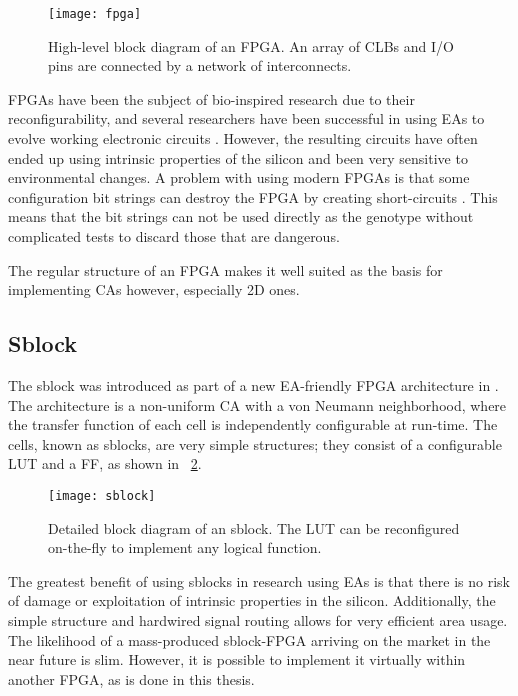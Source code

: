\begin{figure}[!ht]
    \centering
    \texttt{[image: fpga]}
    \caption[FPGA]{
        High-level block diagram of an FPGA.
        An array of CLBs and I/O pins are connected by a network of interconnects.
    }
    \label{fig:fpga}
\end{figure}

FPGAs have been the subject of bio-inspired research due to their reconfigurability, and several researchers have been successful in using EAs to evolve working electronic circuits \cite{huelsbergen1998evolution, thompson1997evolved}.
However, the resulting circuits have often ended up using intrinsic properties of the silicon and been very sensitive to environmental changes.
A problem with using modern FPGAs is that some configuration bit strings can destroy the FPGA by creating short-circuits \cite{xapp151, ug380}.
This means that the bit strings can not be used directly as the genotype without complicated tests to discard those that are dangerous.

The regular structure of an FPGA makes it well suited as the basis for implementing CAs however, especially 2D ones.

\subsection{Sblock}
\label{sec:sblock}

The sblock was introduced as part of a new EA-friendly FPGA architecture in \cite{haddow2000sblock}.
The architecture is a non-uniform CA with a von Neumann neighborhood, where the transfer function of each cell is independently configurable at run-time.
The cells, known as sblocks, are very simple structures; they consist of a configurable LUT and a FF, as shown in \figurename~\ref{fig:sblock}.

\begin{figure}[!ht]
    \centering
    \texttt{[image: sblock]}
    \caption[Sblock]{
        Detailed block diagram of an sblock.
        The LUT can be reconfigured on-the-fly to implement any logical function.
    }
    \label{fig:sblock}
\end{figure}

The greatest benefit of using sblocks in research using EAs is that there is no risk of damage or exploitation of intrinsic properties in the silicon.
Additionally, the simple structure and hardwired signal routing allows for very efficient area usage.
The likelihood of a mass-produced sblock-FPGA arriving on the market in the near future is slim.
However, it is possible to implement it virtually within another FPGA, as is done in this thesis.

